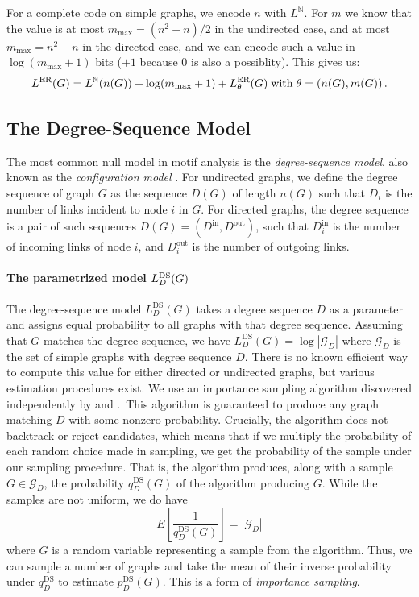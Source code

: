 \documentclass[twoside,11pt]{article}
\newcommand{\p}{\mbox{\,.}}
\newcommand{\cG}{{\mathcal G}}
\newcommand{\N}{{\mathbb N}}
\begin{document}
For a complete code on simple graphs, we encode $n$ with $L^\N$. For $m$ we know that the value is at most $m_\text{max}=(n^2-n)/2$ in the undirected case, and at most $m_\text{max}=n^2-n$ in the directed case, and we can encode such a value in $\log (m_\text{max} + 1)$ bits ($+1$ because $0$ is also a possiblity). This gives us:
\[
L^\text{ER}(G) = L^\N(n(G)) + \log (m_\text{max} + 1) + L^\text{ER}_{\theta}(G)\;\text{with}\;\theta=(n(G),m(G))\p
\]
 
\subsection{The Degree-Sequence Model}
\label{section:degree-sequence-model}

The most common null model in motif analysis is the \emph{degree-sequence model}, also known as the \emph{configuration model} \citep{newman2010networks}. 
For undirected graphs, we define the degree sequence of graph $G$ as the sequence $D(G)$ of length $n(G)$ such that $D_i$ is the number of links incident to node $i$ in $G$. For directed graphs, the degree sequence is a pair of such sequences $D(G) = (D^\text{in}, D^\text{out})$, such that $D^\text{in}_i$ is the number of incoming links of node $i$, and $D^\text{out}_i$ is the number of outgoing links.

\paragraph{The parametrized model $L^\textnormal{DS}_D(G)$} The degree-sequence model $L^\text{DS}_D(G)$ takes a degree sequence $D$ as a parameter and assigns equal probability to all graphs with that degree sequence. Assuming that $G$ matches the degree sequence, we have $L^\text{DS}_D(G) = \log |\cG_D|$ where $\cG_D$ is the set of simple graphs with degree sequence $D$. There is no known efficient way to compute this value for either directed or undirected graphs, but various estimation procedures exist. We use an importance sampling algorithm discovered independently by \cite{blitzstein2011sequential} and \cite{charo2010efficient}.\footnotemark~This algorithm is guaranteed to produce any graph matching $D$ with some nonzero probability. Crucially, the algorithm does not backtrack or reject candidates, which means that if we multiply the probability of each random choice made in sampling, we get the probability of the sample under our sampling procedure. That is, the algorithm produces, along with a sample $G \in \cG_D$, the probability $q^\text{DS}_D(G)$ of the algorithm producing $G$. While the samples are not uniform, we do have
\begin{equation}
{E} \left [\frac{1}{q^\text{DS}_D(G)}\right] = |\cG_D| \label{line:expectation}
\end{equation}
where $G$ is a random variable representing a sample from the algorithm. Thus, we can sample a number of graphs and take the mean of their inverse probability under $q^\text{DS}_D$ to estimate $p^\text{DS}_D(G)$. This is a form of \emph{importance sampling}. 
\end{document}
